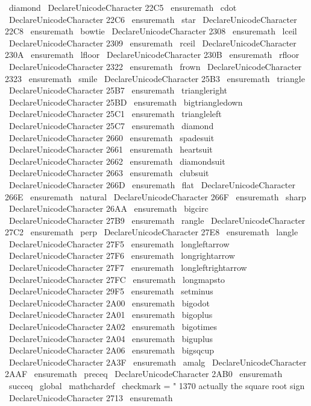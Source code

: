 {{{{{{\
diamond
}
%
\
DeclareUnicodeCharacter
{
22C5
}
{
\
ensuremath
\
cdot
}
%
\
DeclareUnicodeCharacter
{
22C6
}
{
\
ensuremath
\
star
}
%
\
DeclareUnicodeCharacter
{
22C8
}
{
\
ensuremath
\
bowtie
}
%
\
DeclareUnicodeCharacter
{
2308
}
{
\
ensuremath
\
lceil
}
%
\
DeclareUnicodeCharacter
{
2309
}
{
\
ensuremath
\
rceil
}
%
\
DeclareUnicodeCharacter
{
230A
}
{
\
ensuremath
\
lfloor
}
%
\
DeclareUnicodeCharacter
{
230B
}
{
\
ensuremath
\
rfloor
}
%
\
DeclareUnicodeCharacter
{
2322
}
{
\
ensuremath
\
frown
}
%
\
DeclareUnicodeCharacter
{
2323
}
{
\
ensuremath
\
smile
}
%
%
\
DeclareUnicodeCharacter
{
25B3
}
{
\
ensuremath
\
triangle
}
%
\
DeclareUnicodeCharacter
{
25B7
}
{
\
ensuremath
\
triangleright
}
%
\
DeclareUnicodeCharacter
{
25BD
}
{
\
ensuremath
\
bigtriangledown
}
%
\
DeclareUnicodeCharacter
{
25C1
}
{
\
ensuremath
\
triangleleft
}
%
\
DeclareUnicodeCharacter
{
25C7
}
{
\
ensuremath
\
diamond
}
%
\
DeclareUnicodeCharacter
{
2660
}
{
\
ensuremath
\
spadesuit
}
%
\
DeclareUnicodeCharacter
{
2661
}
{
\
ensuremath
\
heartsuit
}
%
\
DeclareUnicodeCharacter
{
2662
}
{
\
ensuremath
\
diamondsuit
}
%
\
DeclareUnicodeCharacter
{
2663
}
{
\
ensuremath
\
clubsuit
}
%
\
DeclareUnicodeCharacter
{
266D
}
{
\
ensuremath
\
flat
}
%
\
DeclareUnicodeCharacter
{
266E
}
{
\
ensuremath
\
natural
}
%
\
DeclareUnicodeCharacter
{
266F
}
{
\
ensuremath
\
sharp
}
%
\
DeclareUnicodeCharacter
{
26AA
}
{
\
ensuremath
\
bigcirc
}
%
\
DeclareUnicodeCharacter
{
27B9
}
{
\
ensuremath
\
rangle
}
%
\
DeclareUnicodeCharacter
{
27C2
}
{
\
ensuremath
\
perp
}
%
\
DeclareUnicodeCharacter
{
27E8
}
{
\
ensuremath
\
langle
}
%
\
DeclareUnicodeCharacter
{
27F5
}
{
\
ensuremath
\
longleftarrow
}
%
\
DeclareUnicodeCharacter
{
27F6
}
{
\
ensuremath
\
longrightarrow
}
%
\
DeclareUnicodeCharacter
{
27F7
}
{
\
ensuremath
\
longleftrightarrow
}
%
\
DeclareUnicodeCharacter
{
27FC
}
{
\
ensuremath
\
longmapsto
}
%
\
DeclareUnicodeCharacter
{
29F5
}
{
\
ensuremath
\
setminus
}
%
\
DeclareUnicodeCharacter
{
2A00
}
{
\
ensuremath
\
bigodot
}
%
\
DeclareUnicodeCharacter
{
2A01
}
{
\
ensuremath
\
bigoplus
}
%
\
DeclareUnicodeCharacter
{
2A02
}
{
\
ensuremath
\
bigotimes
}
%
\
DeclareUnicodeCharacter
{
2A04
}
{
\
ensuremath
\
biguplus
}
%
\
DeclareUnicodeCharacter
{
2A06
}
{
\
ensuremath
\
bigsqcup
}
%
\
DeclareUnicodeCharacter
{
2A3F
}
{
\
ensuremath
\
amalg
}
%
\
DeclareUnicodeCharacter
{
2AAF
}
{
\
ensuremath
\
preceq
}
%
\
DeclareUnicodeCharacter
{
2AB0
}
{
\
ensuremath
\
succeq
}
%
%
\
global
\
mathchardef
\
checkmark
=
"
1370
%
actually
the
square
root
sign
\
DeclareUnicodeCharacter
{
2713
}
{
\
ensuremath
}}}}}}

